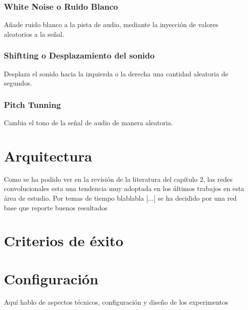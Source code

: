 \documentclass[11pt,a4paper,spanish]{book}
\begin{document}
	
		\subsubsection{White Noise o Ruido Blanco}
		Añade ruido blanco a la pista de audio, mediante la inyección de valores aleatorios a la señal.
		
		\subsubsection{Shiftting o Desplazamiento del sonido}
		Desplaza el sonido hacia la izquierda o la derecha una cantidad aleatoria de segundos.
		
		\subsubsection{Pitch Tunning}
		Cambia el tono de la señal de audio de manera aleatoria.
		
	\section{Arquitectura}
	Como se ha podido ver en la revisión de la literatura del capítulo 2, las redes convolucionales esta una tendencia muy adoptada en los últimos trabajos en esta área de estudio.
	Por temas de tiempo blablabla [...] se ha decidido por una red base que reporte buenos resultados
	\section{Criterios de éxito}
	\section{Configuración}
	Aquí hablo de aspectos técnicos, configuración y diseño de los experimentos
	
	
		\printbibliography
	
\end{document}
